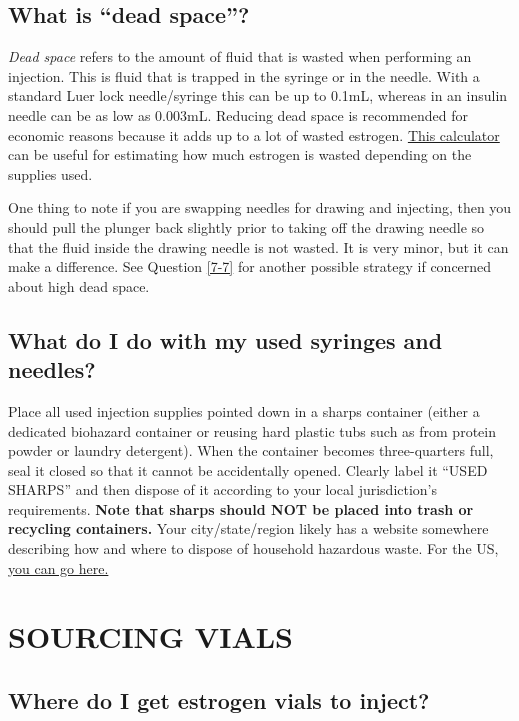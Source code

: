 \documentclass{article}
\begin{document}
{{\subsection{What is “dead space”?}\label{5-26}

\textit{Dead space} refers to the amount of fluid that is wasted when performing an injection. This is fluid that is trapped in the syringe or in the needle. With a standard Luer lock needle/syringe this can be up to 0.1mL, whereas in an insulin needle can be as low as 0.003mL. Reducing dead space is recommended for economic reasons because it adds up to a lot of wasted estrogen. \href{https://hrtcafe.net/Calc/}{This calculator} can be useful for estimating how much estrogen is wasted depending on the supplies used.

One thing to note if you are swapping needles for drawing and injecting, then you should pull the plunger back slightly prior to taking off the drawing needle so that the fluid inside the drawing needle is not wasted. It is very minor, but it can make a difference. See Question \ref{7-7} for another possible strategy if concerned about high dead space.

\subsection{What do I do with my used syringes and needles?}\label{5-27}

Place all used injection supplies pointed down in a sharps container (either a dedicated biohazard container or reusing hard plastic tubs such as from protein powder or laundry detergent). When the container becomes three-quarters full, seal it closed so that it cannot be accidentally opened. Clearly label it “USED SHARPS” and then dispose of it according to your local jurisdiction's requirements. \textbf{Note that sharps should NOT be placed into trash or recycling containers.} Your city/state/region likely has a website somewhere describing how and where to dispose of household hazardous waste. For the US, \href{https://safeneedledisposal.org/}{you can go here.}



\section{SOURCING VIALS}\label{sv}

\subsection{Where do I get estrogen vials to inject?}

}}
\end{document}
